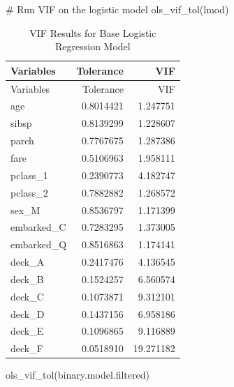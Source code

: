 \documentclass[
  letterpaper,
  DIV=11,
  numbers=noendperiod]{scrartcl}
\newenvironment{Shaded}{\begin{snugshade}}{\end{snugshade}}
\newcommand{\CommentTok}[1]{\textcolor[rgb]{0.37,0.37,0.37}{#1}}
\newcommand{\FunctionTok}[1]{\textcolor[rgb]{0.28,0.35,0.67}{#1}}
\newcommand{\NormalTok}[1]{\textcolor[rgb]{0.00,0.23,0.31}{#1}}
\begin{document}
\begin{Shaded}
\begin{Highlighting}[]
\CommentTok{\# Run VIF on the logistic model}
\FunctionTok{ols\_vif\_tol}\NormalTok{(lmod)}
\end{Highlighting}
\end{Shaded}

\begin{longtable}[]{@{}lrr@{}}
\caption{VIF Results for Base Logistic Regression Model}\tabularnewline
\toprule\noalign{}
Variables & Tolerance & VIF \\
\midrule\noalign{}
\endfirsthead
\toprule\noalign{}
Variables & Tolerance & VIF \\
\midrule\noalign{}
\endhead
\bottomrule\noalign{}
\endlastfoot
age & 0.8014421 & 1.247751 \\
sibsp & 0.8139299 & 1.228607 \\
parch & 0.7767675 & 1.287386 \\
fare & 0.5106963 & 1.958111 \\
pclass\_1 & 0.2390773 & 4.182747 \\
pclass\_2 & 0.7882882 & 1.268572 \\
sex\_M & 0.8536797 & 1.171399 \\
embarked\_C & 0.7283295 & 1.373005 \\
embarked\_Q & 0.8516863 & 1.174141 \\
deck\_A & 0.2417476 & 4.136545 \\
deck\_B & 0.1524257 & 6.560574 \\
deck\_C & 0.1073871 & 9.312101 \\
deck\_D & 0.1437156 & 6.958186 \\
deck\_E & 0.1096865 & 9.116889 \\
deck\_F & 0.0518910 & 19.271182 \\
\end{longtable}

\begin{Shaded}
\begin{Highlighting}[]
\FunctionTok{ols\_vif\_tol}\NormalTok{(binary.model.filtered)}
\end{Highlighting}
\end{Shaded}
\end{document}
